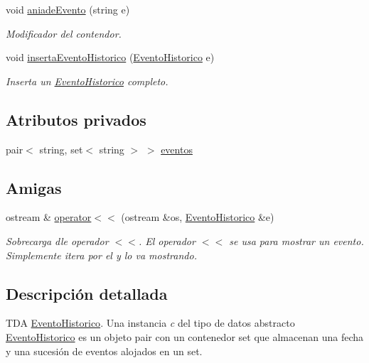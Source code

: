 \begin{DoxyCompactItemize}
void \hyperlink{classEventoHistorico_aedda8393e5c52b32ee3c3a5cbd58ab37}{aniade\+Evento} (string e)
\begin{DoxyCompactList}\small\item\em Modificador del contendor. \end{DoxyCompactList}\item 
void \hyperlink{classEventoHistorico_ad195324148f8dd147248eeb533f9e512}{inserta\+Evento\+Historico} (\hyperlink{classEventoHistorico}{Evento\+Historico} e)
\begin{DoxyCompactList}\small\item\em Inserta un \hyperlink{classEventoHistorico}{Evento\+Historico} completo. \end{DoxyCompactList}\end{DoxyCompactItemize}
\subsection*{Atributos privados}
\begin{DoxyCompactItemize}
\item 
pair$<$ string, set$<$ string $>$ $>$ \hyperlink{classEventoHistorico_a6abe942b12ab22f551062d7ee9e9e02d}{eventos}
\end{DoxyCompactItemize}
\subsection*{Amigas}
\begin{DoxyCompactItemize}
\item 
ostream \& \hyperlink{classEventoHistorico_aa832ccb9c8af9ae4b90ce61d84cb21b0}{operator$<$$<$} (ostream \&os, \hyperlink{classEventoHistorico}{Evento\+Historico} \&e)
\begin{DoxyCompactList}\small\item\em Sobrecarga dle operador $<$$<$. El operador $<$$<$ se usa para mostrar un evento. Simplemente itera por el y lo va mostrando. \end{DoxyCompactList}\end{DoxyCompactItemize}


\subsection{Descripción detallada}
T\+DA \hyperlink{classEventoHistorico}{Evento\+Historico}. Una instancia {\itshape c} del tipo de datos abstracto {\ttfamily \hyperlink{classEventoHistorico}{Evento\+Historico}} es un objeto pair con un contenedor set que almacenan una fecha y una sucesión de eventos alojados en un set. 

